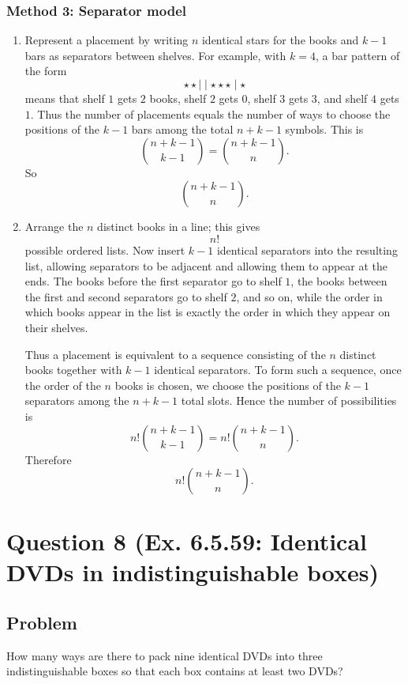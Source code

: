 \documentclass[12pt]{article}
\begin{document}
\newpage
\subsubsection{Method 3: Separator model}
\begin{enumerate}[label=(\alph*)]
\item Represent a placement by writing $n$ identical stars for the books and $k-1$ bars as separators between shelves. For example, with $k=4$, a bar pattern of the form
\[
\star\star\mid\mid\star\star\star\mid\star
\]
means that shelf $1$ gets $2$ books, shelf $2$ gets $0$, shelf $3$ gets $3$, and shelf $4$ gets $1$. Thus the number of placements equals the number of ways to choose the positions of the $k-1$ bars among the total $n+k-1$ symbols. This is
\[
\binom{n+k-1}{k-1}=\binom{n+k-1}{n}.
\]
So
\[
\boxed{\binom{n+k-1}{n}}.
\]

\item Arrange the $n$ distinct books in a line; this gives
\[
n!
\]
possible ordered lists. Now insert $k-1$ identical separators into the resulting list, allowing separators to be adjacent and allowing them to appear at the ends. The books before the first separator go to shelf $1$, the books between the first and second separators go to shelf $2$, and so on, while the order in which books appear in the list is exactly the order in which they appear on their shelves.

Thus a placement is equivalent to a sequence consisting of the $n$ distinct books together with $k-1$ identical separators. To form such a sequence, once the order of the $n$ books is chosen, we choose the positions of the $k-1$ separators among the $n+k-1$ total slots. Hence the number of possibilities is
\[
n!\binom{n+k-1}{k-1}=n!\binom{n+k-1}{n}.
\]
Therefore
\[
\boxed{n!\binom{n+k-1}{n}}.
\]
\end{enumerate}

\newpage

\section{Question 8 (Ex. 6.5.59: Identical DVDs in indistinguishable boxes)}
\subsection{Problem}
How many ways are there to pack nine identical DVDs into three indistinguishable boxes so that each box contains at least two DVDs?
\end{document}
